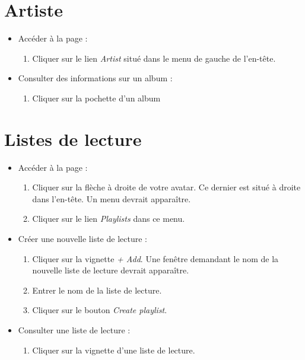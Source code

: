 \documentclass[12pt, letterpaper]{article}
\begin{document}
    \section*{Artiste}
    \begin{itemize}
        \item Accéder à la page :
        \begin{enumerate}
            \item Cliquer sur le lien \textit{Artist} situé dans le menu de gauche de l'en-tête.
        \end{enumerate}

        \item Consulter des informations sur un album :
        \begin{enumerate}
            \item Cliquer sur la pochette d'un album
        \end{enumerate}
    \end{itemize}

    \section*{Listes de lecture}
    \begin{itemize}
        \item Accéder à la page :
        \begin{enumerate}
            \item Cliquer sur la flèche à droite de votre avatar. Ce dernier est situé à droite dans l'en-tête. Un menu devrait apparaître.
            \item Cliquer sur le lien \textit{Playlists} dans ce menu.
        \end{enumerate}

        \item Créer une nouvelle liste de lecture :
        \begin{enumerate}
            \item Cliquer sur la vignette \textit{+ Add}. Une fenêtre demandant le nom de la nouvelle liste de lecture devrait apparaître.

            \item Entrer le nom de la liste de lecture.

            \item Cliquer sur le bouton \textit{Create playlist}.
        \end{enumerate}

        \item Consulter une liste de lecture :
        \begin{enumerate}
            \item Cliquer sur la vignette d'une liste de lecture.
        \end{enumerate}
    \end{itemize}
\end{document}
